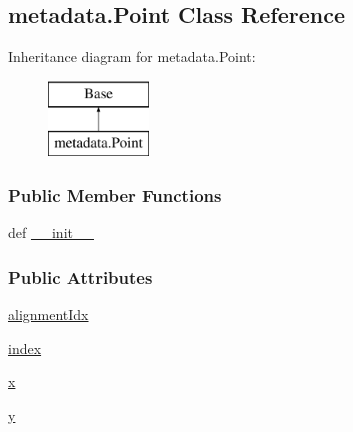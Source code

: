 \hypertarget{classmetadata_1_1Point}{\subsection{metadata.\-Point Class Reference}
\label{classmetadata_1_1Point}
}
Inheritance diagram for metadata.\-Point\-:\begin{figure}[H]
\begin{center}
\leavevmode
\includegraphics[height=2.000000cm]{classmetadata_1_1Point}
\end{center}
\end{figure}
\subsubsection*{Public Member Functions}
\begin{DoxyCompactItemize}
\item 
def \hyperlink{classmetadata_1_1Point_a81982cd2ff6f7ba831ce4745d88e5edd}{\-\_\-\-\_\-init\-\_\-\-\_\-}
\end{DoxyCompactItemize}
\subsubsection*{Public Attributes}
\begin{DoxyCompactItemize}
\item 
\hyperlink{classmetadata_1_1Point_ad295c4033b79c606357bb08faff0d8a2}{alignment\-Idx}
\item 
\hyperlink{classmetadata_1_1Point_a0d937f32b0ac686d9b38e3c186240443}{index}
\item 
\hyperlink{classmetadata_1_1Point_a6230a3f60e40936748114812a7395feb}{x}
\item 
\hyperlink{classmetadata_1_1Point_ab7539f5008fbb1bba9517dae88ef825d}{y}
\end{DoxyCompactItemize}
